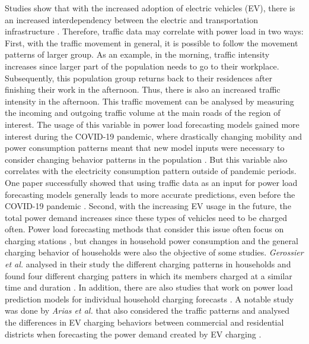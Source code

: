 Studies show that with the increased adoption of electric vehicles (EV), 
there is an increased interdependency between the electric and 
transportation infrastructure \cite{interdependnytrafficenergy}. 
Therefore, traffic data may correlate with power load 
in two ways:
First, with the traffic movement in general, it is possible to follow the
movement patterns of larger group. As an example, in the morning,
traffic intensity increases since larger part of the population needs
to go to their workplace. Subsequently, this population group
returns back to their residences after finishing their work in the afternoon.
Thus, there is also an increased traffic intensity in the afternoon.
This traffic movement can be analysed by measuring the 
incoming and outgoing traffic volume at the main roads of the 
region of interest. The usage of this variable in power load
forecasting models gained more interest during the COVID-19 pandemic, 
where drastically changing mobility and power consumption 
patterns meant that new model inputs were necessary to consider changing
behavior patterns in the population 
\cite{covidtrafficpower} \cite{covidtrafficpower2}.
But this variable also correlates with the electricity consumption pattern
outside of pandemic periods. One paper successfully showed that
using traffic data as an input for power load
forecasting models generally leads to more accurate predictions, even before
the COVID-19 pandemic \cite{causalmodeltrafficelectricity}.
Second, with the increasing EV usage in the future, 
the total power demand increases since these types of vehicles 
need to be charged often. Power load forecasting methods that consider this
issue often focus on charging stations \cite{evcharchingstations}
\cite{evcharchingstations2}, but changes in household power consumption 
and the general charging behavior of households
were also the objective of some studies. \textit{Gerossier et al.}
analysed in their study the different charging patterns in households
and found four different charging patters in which its members charged at 
a similar time and duration \cite{gerossier2019modeling}.
In addition, there are also studies that work on
power load prediction models for individual household
charging forecasts \cite{skala2023interval}. 
A notable study was done by \textit{Arias et al.} that also considered the traffic patterns
and analysed the differences in EV charging behaviors between
commercial and residential districts when forecasting the power demand
created by EV charging \cite{arias2016electric}.

